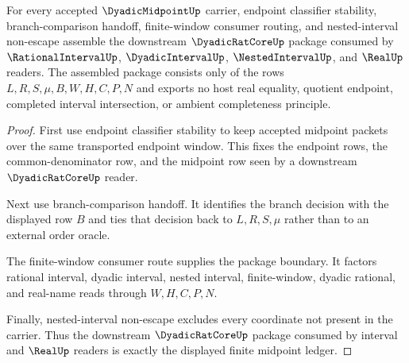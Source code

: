 \begin{theorem}\label{thm:dyadicmidpoint-downstream-dyadicratcore-package}
For every accepted $\DyadicMidpointUp$ carrier, endpoint classifier stability, branch-comparison handoff, finite-window consumer routing, and nested-interval non-escape assemble the downstream $\DyadicRatCoreUp$ package consumed by $\RationalIntervalUp$, $\DyadicIntervalUp$, $\NestedIntervalUp$, and $\RealUp$ readers. The assembled package consists only of the rows $L,R,S,\mu,B,W,H,C,P,N$ and exports no host real equality, quotient endpoint, completed interval intersection, or ambient completeness principle.
\end{theorem}
\begin{proof}
First use endpoint classifier stability to keep accepted midpoint packets over the same transported endpoint window. This fixes the endpoint rows, the common-denominator row, and the midpoint row seen by a downstream $\DyadicRatCoreUp$ reader.

Next use branch-comparison handoff. It identifies the branch decision with the displayed row $B$ and ties that decision back to $L,R,S,\mu$ rather than to an external order oracle.

The finite-window consumer route supplies the package boundary. It factors rational interval, dyadic interval, nested interval, finite-window, dyadic rational, and real-name reads through $W,H,C,P,N$.

Finally, nested-interval non-escape excludes every coordinate not present in the carrier. Thus the downstream $\DyadicRatCoreUp$ package consumed by interval and $\RealUp$ readers is exactly the displayed finite midpoint ledger.
\end{proof}

